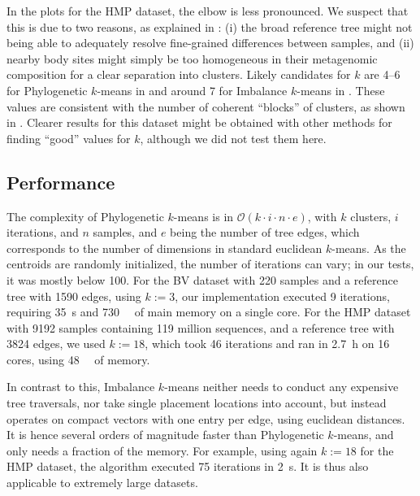In the plots for the \ac{HMP} dataset, the elbow is less pronounced.
We suspect that this is due to two reasons, as explained in :
(i) the broad reference tree might not being able to adequately resolve fine-grained differences between samples,
and (ii) nearby body sites might simply be too homogeneous in their metagenomic composition for a clear separation into clusters.
Likely candidates for $k$ are \num{4}--\num{6} for Phylogenetic $k$-means in 
and around \num{7} for Imbalance $k$-means in .
These values are consistent with the number of coherent ``blocks'' of clusters,
as shown in .
Clearer results for this dataset might be obtained with other methods for finding ``good'' values for $k$,
although we did not test them here.


\subsection{Performance}
\label{ch:Clustering:sec:Results:sub:Performance}

The complexity of Phylogenetic $k$-means is in $\mathcal{O}(k \cdot i \cdot n \cdot e)$,
with $k$ clusters, $i$ iterations, and $n$ samples, and $e$ being the number of tree edges,
which corresponds to the number of dimensions in standard euclidean $k$-means.
As the centroids are randomly initialized, the number of iterations can vary;
in our tests, it was mostly below \num{100}.
For the \ac{BV} dataset with \num{220} samples and a reference tree with \num{1 590} edges, using $k:=3$,
our implementation executed \num{9} iterations, requiring \SI{35}{\second} and \SI{730}{\mega\byte} of main memory on a single core.
For the \ac{HMP} dataset with \num{9 192} samples containing \num{119} million sequences,
and a reference tree with \num{3 824} edges, we used $k:=18$,
which took \num{46} iterations and ran in \SI{2.7}{\hour} on \num{16} cores, using \SI{48}{\giga\byte} of memory.

In contrast to this, Imbalance $k$-means neither needs to conduct any expensive tree traversals,
nor take single placement locations into account,
but instead operates on compact vectors with one entry per edge, using euclidean distances.
It is hence several orders of magnitude faster than Phylogenetic $k$-means, and only needs a fraction of the memory.
For example, using again $k:=18$ for the \ac{HMP} dataset,
the algorithm executed \num{75} iterations in \SI{2}{\second}.
It is thus also applicable to extremely large datasets.

